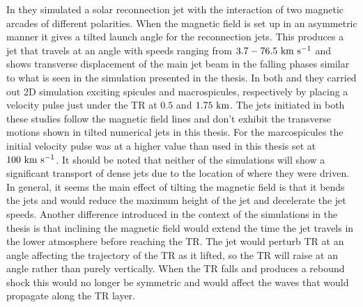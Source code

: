 {In \cite{Gonz2017ApJ} they simulated a solar reconnection jet with the interaction of two magnetic arcades of different polarities. When the magnetic field is set up in an asymmetric manner it gives a tilted launch angle for the reconnection jets. This produces a jet that travels at an angle with speeds ranging from $3.7-76.5~\rm{km ~s^{-1}}$ and shows transverse displacement of the main jet beam in the falling phases similar to what is seen in the simulation presented in the thesis. In both \cite{Murawski2010AA519A8M} and \cite{Gonz2021MNRAS50550G} they carried out 2D simulation exciting spicules and macrospicules, respectively by placing a velocity pulse just under the TR at $0.5$ and $1.75~\rm{km}$. The jets initiated in both these studies follow the magnetic field lines and don’t exhibit the transverse motions shown in tilted numerical jets in this thesis. For the marcospicules the initial velocity pulse was at a higher value than used in this thesis set at $100~\rm{km ~s^{-1}}$. It should be noted that neither of the simulations will show a significant transport of dense jets due to the location of where they were driven. In general, it seems the main effect of tilting the magnetic field is that it bends the jets and would reduce the maximum height of the jet and decelerate the jet speeds. Another difference introduced in the context of the simulations in the thesis is that inclining the magnetic field would extend the time the jet travels in the lower atmosphere before reaching the TR. The jet would perturb TR at an angle affecting the trajectory of the TR as it lifted, so the TR will raise at an angle rather than purely vertically. When the TR falls and produces a rebound shock this would no longer be symmetric and would affect the waves that would propagate along the TR layer.}

